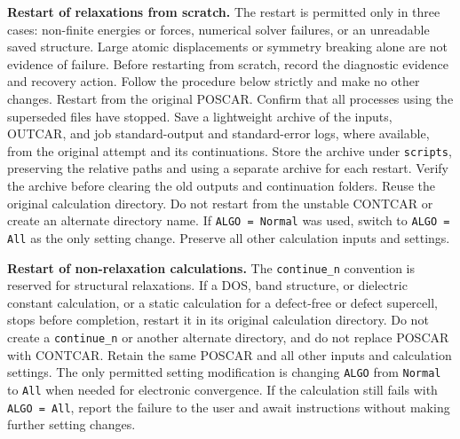 \documentclass[aip,jap,reprint,amsmath,amssymb]{revtex4-2}
\begin{document}
\textbf{Restart of relaxations from scratch.} The restart is permitted only in three cases: non-finite energies or forces, numerical solver failures, or an unreadable saved structure. Large atomic displacements or symmetry breaking alone are not evidence of failure. Before restarting from scratch, record the diagnostic evidence and recovery action. Follow the procedure below strictly and make no other changes. Restart from the original POSCAR. Confirm that all processes using the superseded files have stopped. Save a lightweight archive of the inputs, OUTCAR, and job standard-output and standard-error logs, where available, from the original attempt and its continuations. Store the archive under \texttt{scripts}, preserving the relative paths and using a separate archive for each restart. Verify the archive before clearing the old outputs and continuation folders. Reuse the original calculation directory. Do not restart from the unstable CONTCAR or create an alternate directory name. If \texttt{ALGO = Normal} was used, switch to \texttt{ALGO = All} as the only setting change. Preserve all other calculation inputs and settings.

\textbf{Restart of non-relaxation calculations.} The \texttt{continue\_n} convention is reserved for structural relaxations. If a DOS, band structure, or dielectric constant calculation, or a static calculation for a defect-free or defect supercell, stops before completion, restart it in its original calculation directory. Do not create a \texttt{continue\_n} or another alternate directory, and do not replace POSCAR with CONTCAR. Retain the same POSCAR and all other inputs and calculation settings. The only permitted setting modification is changing \texttt{ALGO} from \texttt{Normal} to \texttt{All} when needed for electronic convergence. If the calculation still fails with \texttt{ALGO = All}, report the failure to the user and await instructions without making further setting changes.
\end{document}
